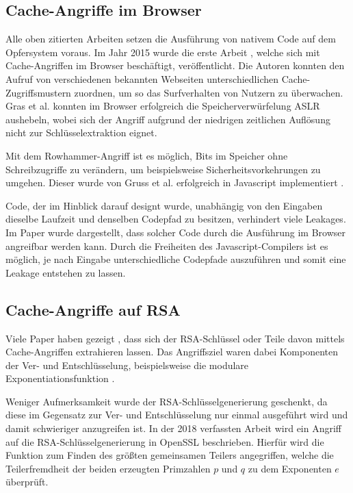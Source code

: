 \subsection{Cache-Angriffe im Browser}

Alle oben zitierten Arbeiten setzen die Ausführung von nativem Code auf dem Opfersystem voraus. Im Jahr 2015 wurde die erste Arbeit \cite{TheSpyInTheSandbox}, welche sich mit Cache-Angriffen im Browser beschäftigt, veröffentlicht.
Die Autoren konnten den Aufruf von verschiedenen bekannten Webseiten unterschiedlichen Cache-Zugriffsmustern zuordnen, um so das Surfverhalten von Nutzern zu überwachen.
Gras et al. \cite{ASLROnTheLine} konnten im Browser erfolgreich die Speicherverwürfelung ASLR aushebeln, wobei sich der Angriff aufgrund der niedrigen zeitlichen Auflösung nicht zur Schlüsselextraktion eignet.

Mit dem Rowhammer-Angriff \cite{Rowhammer} ist es möglich, Bits im Speicher ohne Schreibzugriffe zu verändern, um beispielsweise Sicherheitsvorkehrungen zu umgehen. 
Dieser wurde von Gruss et al. erfolgreich in Javascript implementiert \cite{RowhammerJS}.

Code, der im Hinblick darauf designt wurde, unabhängig von den Eingaben dieselbe Laufzeit und denselben Codepfad zu besitzen, verhindert viele Leakages.
Im Paper \cite{DriveByPaper} wurde dargestellt, dass solcher Code durch die Ausführung im Browser angreifbar werden kann.
Durch die Freiheiten des Javascript-Compilers ist es möglich, je nach Eingabe unterschiedliche Codepfade auszuführen und somit eine Leakage entstehen zu lassen.

\subsection{Cache-Angriffe auf RSA}

Viele Paper haben gezeigt \cite{CacheBleedOpenSSLRSA, FlushReload, DriveByPaper}, dass sich der RSA-Schlüssel oder Teile davon mittels Cache-Angriffen extrahieren lassen. Das Angriffsziel waren dabei Komponenten der Ver- und Entschlüsselung, beispielsweise die modulare Exponentiationsfunktion \cite{CacheBleedOpenSSLRSA, DriveByPaper, DriveByPaper}. 


Weniger Aufmerksamkeit wurde der RSA-Schlüsselgenerierung geschenkt, da diese im Gegensatz zur Ver- und Entschlüsselung nur einmal ausgeführt wird und damit schwieriger anzugreifen ist.
In der 2018 verfassten Arbeit \cite{RSAKeyGeneration2} wird ein Angriff auf die RSA-Schlüsselgenerierung in OpenSSL beschrieben.
Hierfür wird die Funktion zum Finden des größten gemeinsamen Teilers angegriffen, welche die Teilerfremdheit der beiden erzeugten Primzahlen $p$ und $q$ zu dem Exponenten $e$ überprüft.

